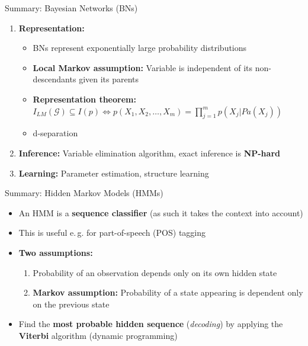 \begin{frame}{Summary: Bayesian Networks (BNs)}{}
	\begin{enumerate}
		\item \textbf{Representation:}
		\begin{itemize}
			\item BNs represent exponentially large probability distributions
			\item \textbf{Local Markov assumption:} Variable is independent of its non-descendants given its parents
			\item \textbf{Representation theorem:}
				$I_{LM}(\mathcal{G}) \subseteq I(p) \Leftrightarrow p(X_1, X_2, \dots, X_m) =
					\prod_{j=1}^m p(X_j \vert Pa(X_j))$
			\item d-separation
		\end{itemize}
		\item \textbf{Inference:} Variable elimination algorithm, exact inference is \textbf{NP-hard}
		\item \textbf{Learning:} Parameter estimation, structure learning
	\end{enumerate}
\end{frame}


\begin{frame}{Summary: Hidden Markov Models (HMMs)}{}
	\begin{itemize}
		\item An HMM is a \textbf{sequence classifier} (as such it takes the context into account)
		\item This is useful e.\,g. for part-of-speech (POS) tagging
		\item \textbf{Two assumptions:}
		\begin{enumerate}
			\item Probability of an observation depends only on its own hidden state
			\item \textbf{Markov assumption:} Probability of a state appearing is dependent only on the previous state
		\end{enumerate}
		\item Find the \textbf{most probable hidden sequence} (\textit{decoding}) by applying the \textbf{Viterbi} algorithm
			(dynamic programming)
	\end{itemize}
\end{frame}


